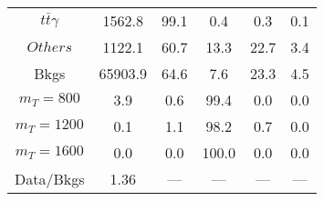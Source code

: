 \begin{figure}
\begin{minipage}[c]{0.32\textwidth}
{\begin{tabular}{cccccc}
$ t\bar{t}\gamma $ &  1562.8 &  99.1 &  0.4 &  0.3 &  0.1\\
$ Others $ &  1122.1 &  60.7 &  13.3 &  22.7 &  3.4\\
Bkgs &  65903.9 &  64.6 &  7.6 &  23.3 &  4.5\\
$ m_{T} = 800 $ &  3.9 &  0.6 &  99.4 &  0.0 &  0.0\\
$ m_{T} = 1200 $ &  0.1 &  1.1 &  98.2 &  0.7 &  0.0\\
$ m_{T} = 1600 $ &  0.0 &  0.0 &  100.0 &  0.0 &  0.0\\
Data/Bkgs &  1.36 &  --- &  --- &  --- &  ---\\
\hline
\end{tabular}
}
\end{minipage}
\end{figure}

